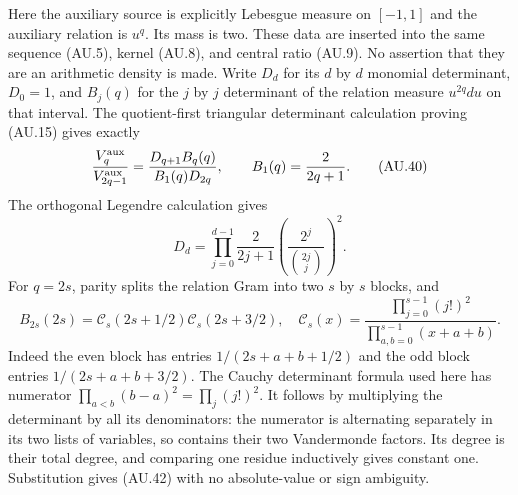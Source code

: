 Here the auxiliary source is explicitly Lebesgue measure on $[-1,1]$
and the auxiliary relation is $u^q$. Its mass is two. These data are
inserted into the same sequence (AU.5), kernel (AU.8), and central
ratio (AU.9). No assertion that they are an arithmetic density is
made. Write $D_d$ for its $d$ by $d$ monomial determinant, $D_0=1$,
and $B_j(q)$ for the $j$ by $j$ determinant of the relation measure
$u^{2q}du$ on that interval. The quotient-first triangular determinant
calculation proving (AU.15) gives exactly
\[
 \frac{V_q^{\rm aux}}{V_{2q-1}^{\rm aux}}
       =\frac{D_{q+1}B_q(q)}{B_1(q)D_{2q}},\qquad
 B_1(q)=\frac2{2q+1}.                                    \tag{AU.40}
\]
The orthogonal Legendre calculation gives
\[
 D_d=\prod_{j=0}^{d-1}\frac{2}{2j+1}
         \left(\frac{2^j}{\binom{2j}{j}}\right)^2.        \tag{AU.41}
\]
For $q=2s$, parity splits the relation Gram into two $s$ by $s$
blocks, and
\[
 B_{2s}(2s)=\mathcal C_s(2s+1/2)\mathcal C_s(2s+3/2),
 \quad
 \mathcal C_s(x)=\frac{\prod_{j=0}^{s-1}(j!)^2}
                       {\prod_{a,b=0}^{s-1}(x+a+b)}.
 \tag{AU.42}
\]
Indeed the even block has entries $1/(2s+a+b+1/2)$ and the odd
block entries $1/(2s+a+b+3/2)$. The Cauchy determinant formula
used here has numerator $\prod_{a<b}(b-a)^2=\prod_j(j!)^2$.
It follows by multiplying the determinant by all its denominators:
the numerator is alternating separately in its two lists of variables,
so contains their two Vandermonde factors. Its degree is their total
degree, and comparing one residue inductively gives constant one.
Substitution gives (AU.42) with no absolute-value or sign ambiguity.

